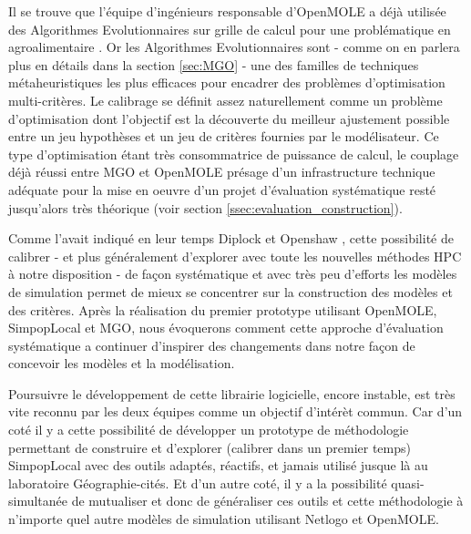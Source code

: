 Il se trouve que l'équipe d'ingénieurs responsable d'OpenMOLE a déjà utilisée des Algorithmes Evolutionnaires sur grille de calcul pour une problématique en agroalimentaire \autocite{Mesmoudi2010}. Or les Algorithmes Evolutionnaires sont - comme on en parlera plus en détails dans la section \ref{sec:MGO} - une des familles de techniques métaheuristiques les plus efficaces pour encadrer des problèmes d'optimisation multi-critères. Le calibrage se définit assez naturellement comme un problème d'optimisation dont l'objectif est la découverte du meilleur ajustement possible entre un jeu hypothèses et un jeu de critères fournies par le modélisateur. Ce type d'optimisation étant très consommatrice de puissance de calcul, le couplage déjà réussi entre MGO et OpenMOLE présage d'un infrastructure technique adéquate pour la mise en oeuvre d'un projet d'évaluation systématique resté jusqu'alors très théorique (voir section \ref{ssec:evaluation_construction}). 

Comme l'avait indiqué en leur temps Diplock et Openshaw \autocite{Diplock1996}, cette possibilité de calibrer - et plus généralement d'explorer avec toute les nouvelles méthodes HPC à notre disposition - de façon systématique et avec très peu d'efforts les modèles de simulation permet de mieux se concentrer sur la construction des modèles et des critères. Après la réalisation du premier prototype utilisant OpenMOLE, SimpopLocal et MGO, nous évoquerons comment cette approche d'évaluation systématique a continuer d'inspirer des changements dans notre façon de concevoir les modèles et la modélisation. %

Poursuivre le développement de cette librairie logicielle, encore instable, est très vite reconnu par les deux équipes comme un objectif d'intérèt commun. Car d'un coté il y a cette possibilité de développer un prototype de méthodologie permettant de construire et d'explorer (calibrer dans un premier temps) SimpopLocal avec des outils adaptés, réactifs, et jamais utilisé jusque là au laboratoire Géographie-cités. Et d'un autre coté, il y a la possibilité quasi-simultanée de mutualiser et donc de généraliser ces outils et cette méthodologie à n'importe quel autre modèles de simulation utilisant Netlogo et OpenMOLE.


